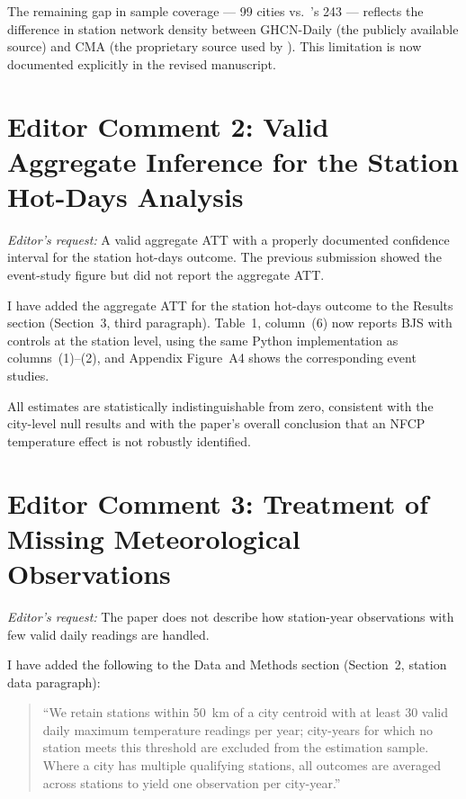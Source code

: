 \documentclass[12pt]{article}
\begin{document}
The remaining gap in sample coverage --- 99 cities vs.\ \citeauthor{Ma2026}'s
243 --- reflects the difference in station network density between
GHCN-Daily (the publicly available source) and CMA (the proprietary
source used by \citeauthor{Ma2026}).  This limitation is now documented
explicitly in the revised manuscript.

\section*{Editor Comment 2: Valid Aggregate Inference for the Station
Hot-Days Analysis}

\noindent\textit{Editor's request:} A valid aggregate ATT with a
properly documented confidence interval for the station hot-days outcome.
The previous submission showed the event-study figure but did not report
the aggregate ATT.

\bigskip\noindent
I have added the aggregate ATT for the station hot-days outcome to the
Results section (Section~3, third paragraph).  Table~1, column~(6) now
reports BJS with controls at the station level, using the same Python
implementation as columns~(1)--(2), and Appendix Figure~A4 shows the corresponding event studies.

All estimates are statistically indistinguishable from zero, consistent
with the city-level null results and with the paper's overall conclusion
that an NFCP temperature effect is not robustly identified.

\section*{Editor Comment 3: Treatment of Missing Meteorological
Observations}

\noindent\textit{Editor's request:} The paper does not describe how
station-year observations with few valid daily readings are handled.

\bigskip\noindent
I have added the following to the Data and Methods section (Section~2,
station data paragraph):

\begin{quote}
  ``We retain stations within 50~km of a city centroid with at least 30
  valid daily maximum temperature readings per year; city-years for which
  no station meets this threshold are excluded from the estimation sample.
  Where a city has multiple qualifying stations, all outcomes are averaged
  across stations to yield one observation per city-year.''
\end{quote}
\end{document}
